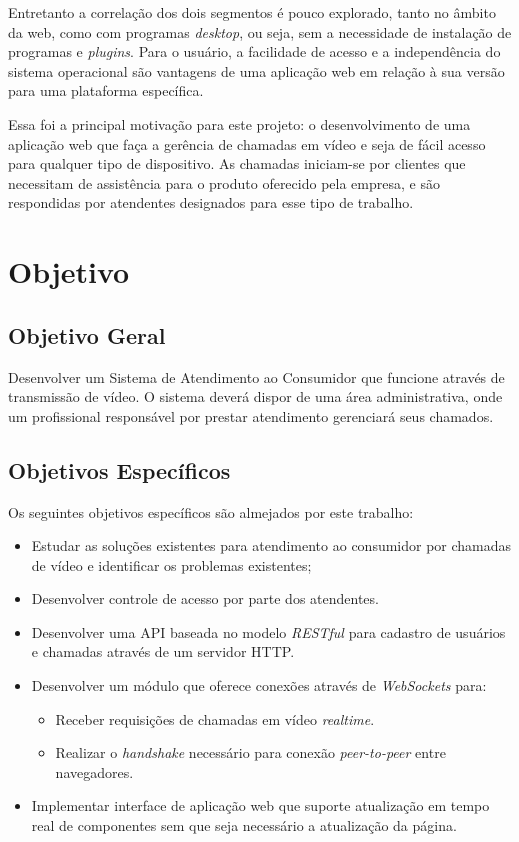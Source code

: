 Entretanto a correlação dos dois segmentos é pouco explorado, tanto no âmbito da web, como com programas \textit{desktop}, ou seja, sem a necessidade de instalação de programas e \textit{plugins}.  Para o usuário, a facilidade de acesso e a independência do sistema operacional são vantagens de uma aplicação web em relação à sua versão para uma plataforma específica. 

Essa foi a principal motivação para este projeto: o desenvolvimento de uma aplicação web que faça a gerência de chamadas em vídeo e seja de fácil acesso para qualquer tipo de dispositivo. As chamadas iniciam-se por clientes que necessitam de assistência para o produto oferecido pela empresa, e são respondidas por atendentes designados para esse tipo de trabalho.

\section{Objetivo}
\subsection{Objetivo Geral}
Desenvolver um Sistema de Atendimento ao Consumidor que funcione através de transmissão de vídeo. O sistema deverá dispor de uma área administrativa, onde um profissional responsável por prestar atendimento gerenciará seus chamados.

\subsection{Objetivos Específicos}
Os seguintes objetivos específicos são almejados por este trabalho:
\begin{itemize}
	\item Estudar as soluções existentes para atendimento ao consumidor por chamadas de vídeo e identificar os problemas existentes;
	\item Desenvolver controle de acesso por parte dos atendentes.
	\item Desenvolver uma API baseada no modelo \textit{RESTful} para cadastro de usuários e chamadas através de um servidor HTTP.
	\item Desenvolver um módulo que oferece conexões através de \textit{WebSockets} para: 
    	\begin{itemize}
        	\item{Receber requisições de chamadas em vídeo \textit{realtime}.}
            \item{Realizar o \textit{handshake} necessário para conexão \textit{peer-to-peer} entre navegadores.}
      	\end{itemize}
	\item Implementar interface de aplicação web que suporte atualização em tempo real de componentes sem que seja necessário a atualização da página.
\end{itemize}

